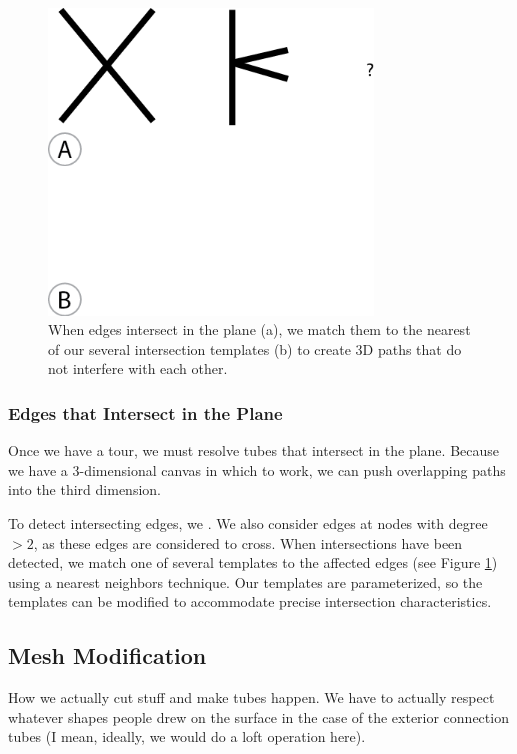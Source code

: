 \begin{figure}[h!]
\centering
    \includegraphics[width=3.4in]{figures/intersection-templates.png}
\caption{When edges intersect in the plane (a), we match them to the nearest of our several intersection templates (b) to create 3D paths that do not interfere with each other.}
\label{fig:templates}
\end{figure}

\subsubsection{Edges that Intersect in the Plane}
Once we have a tour, we must resolve tubes that intersect in the plane.  Because we have a 3-dimensional canvas in which to work, we can push overlapping paths into the third dimension.

To detect intersecting edges, we .  We also consider edges at nodes with degree $>2$, as these edges are considered to cross.  When intersections have been detected, we match one of several templates to the affected edges (see Figure \ref{fig:templates}) using a nearest neighbors technique.  Our templates are parameterized, so the templates can be modified to accommodate precise intersection characteristics.

\subsection{Mesh Modification}

How we actually cut stuff and make tubes happen.   We have to actually respect whatever shapes people drew on the surface in the case of the exterior connection tubes (I mean, ideally, we would do a loft operation here).

